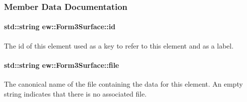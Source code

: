 \subsubsection{Member Data Documentation}
\hypertarget{classew_1_1Form3Surface_aa207964ce409cd2cd7b0d4a02ad18d5a}{
\paragraph[{id}]{\setlength{\rightskip}{0pt plus 5cm}std::string {\bf ew::Form3Surface::id}}\hfill}
\label{classew_1_1Form3Surface_aa207964ce409cd2cd7b0d4a02ad18d5a}
The id of this element used as a key to refer to this element and as a label. \hypertarget{classew_1_1Form3Surface_a70132033d556f202a04d25126e4d2808}{
\paragraph[{file}]{\setlength{\rightskip}{0pt plus 5cm}std::string {\bf ew::Form3Surface::file}}\hfill}
\label{classew_1_1Form3Surface_a70132033d556f202a04d25126e4d2808}
The canonical name of the file containing the data for this element. An empty string indicates that there is no associated file. 
